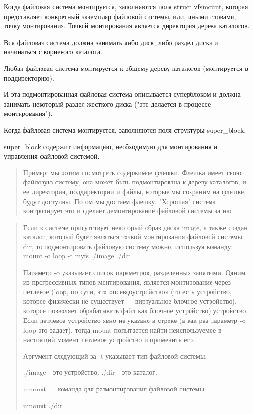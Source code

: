 Когда файловая система монтируется, заполняются поля struct vfsmount, которая представляет конкретный экземпляр файловой системы, или, иными словами, точку монтирования. Точкой монтирования является директория дерева каталогов.

Вся файловая система должна занимать либо диск, либо раздел диска и начинаться с корневого каталога.

Любая файловая система монтируется к общему дереву каталогов (монтируется в поддиректорию).

И эта подмонтированная файловая система описывается суперблоком и должна занимать некоторый раздел жесткого диска ("это делается в процессе монтирования").

Когда файловая система монтируется, заполняются поля структуры super\_block.

super\_block содержит информацию, необходимую для монтирования и управления файловой системой.

\begin{quote}
	Пример: мы хотим посмотреть содержимое флешки. Флешка имеет свою файловую систему, она может быть подмонтирована к дереву каталогов, и ее директории, поддиректории и файлы, которые мы сохраним на флешке, будут доступны. Потом мы достаем флешку. "Хорошая" система контролирует это и сделает демонтирование файловой системы за нас.
\end{quote}

\begin{quote}
	Если в системе присутствует некоторый образ диска image, а также создан каталог, который будет являться точкой монтирования файловой системы dir, то подмонтировать файловую систему можно, используя команду: mount -o loop -t myfs ./image ./dir
	
	Параметр -o указывает список параметров, разделенных запятыми. Одним из прогрессивных типов монтирования, является монтирование через петлевое (loop, по сути, это «псевдоустройство» (то есть устройство, которое физически не существует --- виртуальное блочное устройство), которое позволяет обрабатывать файл как блочное устройство) устройство. Если петлевое устройство явно не указано в строке (а как раз параметр -o loop это задает), тогда mount попытается найти неиспользуемое в настоящий момент петлевое устройство и применить его.
	
	Аргумент следующий за -t указывает тип файловой системы.
	
	./image - это устройство. ./dir - это каталог.
	
	umount — команда для размонтирования файловой системы:
	
	umount ./dir
\end{quote}

